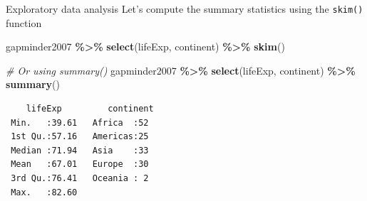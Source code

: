 \documentclass[
  ignorenonframetext,
]{beamer}
\newenvironment{Shaded}{\begin{snugshade}}{\end{snugshade}}
\newcommand{\CommentTok}[1]{\textcolor[rgb]{0.56,0.35,0.01}{\textit{#1}}}
\newcommand{\FunctionTok}[1]{\textcolor[rgb]{0.13,0.29,0.53}{\textbf{#1}}}
\newcommand{\NormalTok}[1]{#1}
\newcommand{\SpecialCharTok}[1]{\textcolor[rgb]{0.81,0.36,0.00}{\textbf{#1}}}
\begin{document}
\begin{frame}[fragile]{Exploratory data analysis}
\protect\hypertarget{exploratory-data-analysis-3}{}
Let's compute the summary statistics using the \texttt{skim()} function

\normalsize

\begin{Shaded}
\begin{Highlighting}[]
\NormalTok{gapminder2007 }\SpecialCharTok{\%\textgreater{}\%} 
  \FunctionTok{select}\NormalTok{(lifeExp, continent) }\SpecialCharTok{\%\textgreater{}\%}
  \FunctionTok{skim}\NormalTok{()}
\end{Highlighting}
\end{Shaded}

\normalsize

\begin{Shaded}
\begin{Highlighting}[]
\CommentTok{\# Or using summary()}
\NormalTok{gapminder2007 }\SpecialCharTok{\%\textgreater{}\%} 
  \FunctionTok{select}\NormalTok{(lifeExp, continent) }\SpecialCharTok{\%\textgreater{}\%}
  \FunctionTok{summary}\NormalTok{()}
\end{Highlighting}
\end{Shaded}

\begin{verbatim}
    lifeExp         continent 
 Min.   :39.61   Africa  :52  
 1st Qu.:57.16   Americas:25  
 Median :71.94   Asia    :33  
 Mean   :67.01   Europe  :30  
 3rd Qu.:76.41   Oceania : 2  
 Max.   :82.60                
\end{verbatim}
\end{frame}
\end{document}
